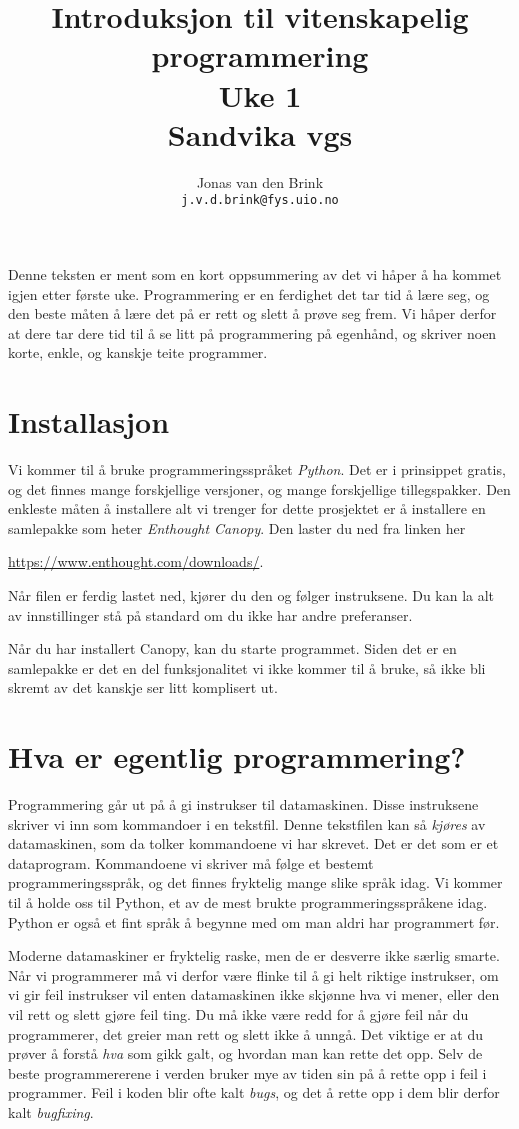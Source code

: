 \documentclass[a4paper, 11pt, notitlepage, english]{article}
\author{Jonas van den Brink \\ \texttt{j.v.d.brink@fys.uio.no}}
\title{Introduksjon til vitenskapelig programmering \\ Uke 1 \\ Sandvika vgs}
\begin{document}
\maketitle

Denne teksten er ment som en kort oppsummering av det vi håper å ha kommet igjen etter første uke. Programmering er en ferdighet det tar tid å lære seg, og den beste måten å lære det på er rett og slett å prøve seg frem. Vi håper derfor at dere tar dere tid til å se litt på programmering på egenhånd, og skriver noen korte, enkle, og kanskje teite programmer.

\section*{Installasjon}

Vi kommer til å bruke programmeringsspråket \emph{Python}. Det er i prinsippet gratis, og det finnes mange forskjellige versjoner, og mange forskjellige tillegspakker. Den enkleste måten å installere alt vi trenger for dette prosjektet er å installere en samlepakke som heter \emph{Enthought Canopy}. Den laster du ned fra linken her

\hspace{2cm}\url{https://www.enthought.com/downloads/}.

Når filen er ferdig lastet ned, kjører du den og følger instruksene. Du kan la alt av innstillinger stå på standard om du ikke har andre preferanser.

Når du har installert Canopy, kan du starte programmet. Siden det er en samle\-pakke er det en del funksjonalitet vi ikke kommer til å bruke, så ikke bli skremt av det kanskje ser litt komplisert ut.

\section*{Hva er egentlig programmering?}

Programmering går ut på å gi instrukser til datamaskinen. Disse instruksene skriver vi inn som kommandoer i en tekstfil. Denne tekstfilen kan så \emph{kjøres} av datamaskinen, som da tolker kommandoene vi har skrevet. Det er det som er et dataprogram. Kommandoene vi skriver må følge et bestemt programmeringsspråk, og det finnes fryktelig mange slike språk idag. Vi kommer til å holde oss til Python, et av de mest brukte programmeringsspråkene idag. Python er også et fint språk å begynne med om man aldri har programmert før.

Moderne datamaskiner er fryktelig raske, men de er desverre ikke særlig smarte. Når vi programmerer må vi derfor være flinke til å gi helt riktige instrukser, om vi gir feil instrukser vil enten datamaskinen ikke skjønne hva vi mener, eller den vil rett og slett gjøre feil ting. Du må ikke være redd for å gjøre feil når du programmerer, det greier man rett og slett ikke å unngå. Det viktige er at du prøver å forstå \emph{hva} som gikk galt, og hvordan man kan rette det opp. Selv de beste programmererene i verden bruker mye av tiden sin på å rette opp i feil i programmer. Feil i koden blir ofte kalt \emph{bugs}, og det å rette opp i dem blir derfor kalt \emph{bugfixing}.
\end{document}
